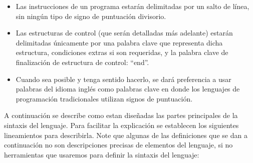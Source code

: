 \documentclass[12pt, spanish]{report}
\begin{document}
\begin{itemize}
\item Las instrucciones de un programa estar\'an delimitadas por un
  salto de l\'inea, sin ning\'un tipo de signo de puntuaci\'on
  divisorio.

\item Las estructuras de control (que ser\'an detalladas m\'as
  adelante) estar\'an delimitadas \'unicamente por una palabra clave
  que representa dicha estructura, condiciones extras si son
  requeridas, y la palabra clave de finalizaci\'on de estructura de
  control: ``end''.

\item Cuando sea posible y tenga sentido hacerlo, se dar\'a
  preferencia a usar palabras del idioma ingl\'es como palabras clave
  en donde los lenguajes de programaci\'on tradicionales utilizan
  signos de puntuaci\'on.
\end{itemize}

A continuaci\'on se describe como estan dise\~nadas las partes
principales de la sintaxis del lenguaje. Para facilitar la
explicaci\'on se establecen los siguientes lineamientos para
describirla. Note que algunas de las definiciones que se dan a
continuaci\'on no son descripciones precisas de elementos del
lenguaje, si no herramientas que usaremos para definir la sintaxis del
lenguaje:
\end{document}
